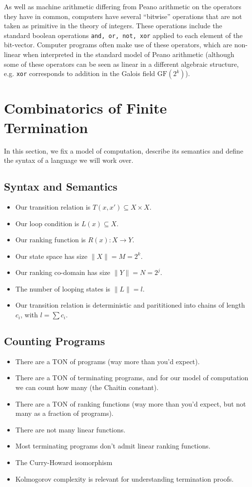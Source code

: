 \documentclass[preprint]{sigplanconf}
\theoremstyle{definition}
\begin{document}
As well as machine arithmetic differing from Peano arithmetic on the operators they have in common,
computers have several ``bitwise'' operations that are not taken as primitive in the theory of
integers.  These operations include the standard boolean operations \texttt{and, or, not, xor}
applied to each element of the bit-vector.  Computer programs often make use of these operators,
which are non-linear when interpreted in the standard model of Peano arithmetic
(although some of these operators can be seen as linear in a different algebraic structure,
e.g. \texttt{xor} corresponds to addition in the Galois field $\mathrm{GF}(2^k)$).

\section{Combinatorics of Finite Termination}
In this section, we fix a model of computation, describe its semantics and
define the syntax of a language we will work over.

\subsection{Syntax and Semantics}

\begin{itemize}
 \item Our transition relation is $T(x, x') \subseteq X \times X$.
 \item Our loop condition is $L(x) \subseteq X$.
 \item Our ranking function is $R(x) : X \to Y$.
 \item Our state space has size $\| X \| = M = 2^k$.
 \item Our ranking co-domain has size $\| Y \| = N = 2^j$.
 \item The number of looping states is $\| L \| = l$.
 \item Our transition relation is deterministic and parititioned into chains of length $c_i$, with $l = \sum c_i$.
\end{itemize}

\subsection{Counting Programs}
\begin{itemize}
 \item There are a TON of programs (way more than you'd expect).
 \item There are a TON of terminating programs, and for our model of computation we can count
  how many (the Chaitin constant).
 \item There are a TON of ranking functions (way more than you'd expect, but not many as a
  fraction of programs).
 \item There are not many linear functions.
 \item Most terminating programs don't admit linear ranking functions.
 \item The Curry-Howard isomorphism
 \item Kolmogorov complexity is relevant for understanding termination proofs.
\end{itemize}
\end{document}
